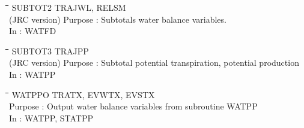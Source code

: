 \nwln
\begin{tabbing}
\hspace{1.27cm}\=\hspace{1.27cm}\=\hspace{1.27cm}\=\hspace{1.27cm}\=%
\hspace{1.27cm}\=\hspace{1.27cm}\=\hspace{1.27cm}\=\hspace{1.27cm}\=%
\hspace{1.27cm}\=\hspace{1.27cm}\=\kill
SUBTOT2\> \> TRAJWL, RELSM\\
(JRC version)\> \> Purpose\> : Subtotals water balance variables.\\
\>\> In\> : WATFD
\end{tabbing}

\nwln
\begin{tabbing}
\hspace{1.27cm}\=\hspace{1.27cm}\=\hspace{1.27cm}\=\hspace{1.27cm}\=%
\hspace{1.27cm}\=\hspace{1.27cm}\=\hspace{1.27cm}\=\hspace{1.27cm}\=%
\hspace{1.27cm}\=\hspace{1.27cm}\=\kill
SUBTOT3\> \> TRAJPP\\
(JRC version)\> \> Purpose\> : Subtotal potential transpiration, potential production\\
\>\> In\> : WATPP
\end{tabbing}

\nwln
\begin{tabbing}
\hspace{1.27cm}\=\hspace{1.27cm}\=\hspace{1.27cm}\=\hspace{1.27cm}\=%
\hspace{1.27cm}\=\hspace{1.27cm}\=\hspace{1.27cm}\=\hspace{1.27cm}\=%
\hspace{1.27cm}\=\hspace{1.27cm}\=\kill
WATPPO\> \> TRATX, EVWTX, EVSTX\\
\>\> Purpose\> : Output water balance variables from subroutine WATPP\\
\>\> In\> : WATPP, STATPP
\end{tabbing}

